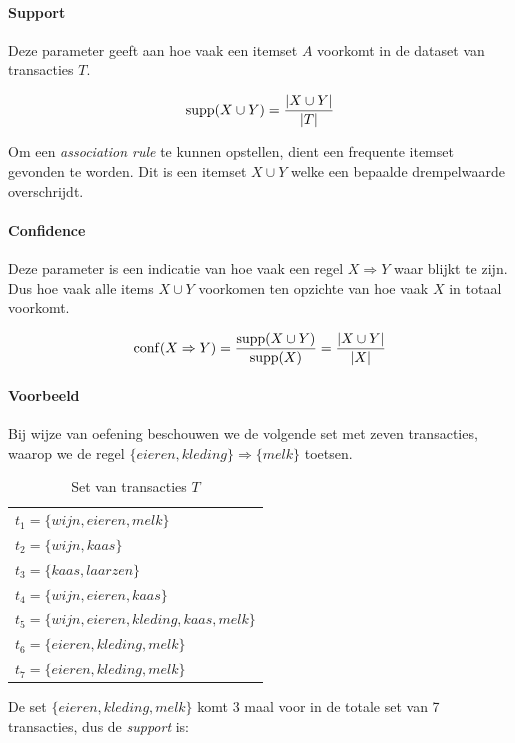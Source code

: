 \paragraph{Support}
Deze parameter geeft aan hoe vaak een itemset $A$ voorkomt in de dataset van transacties $T$. 

\begin{equation}
\operatorname{supp}(X \cup Y) = \frac{|X \cup Y|}{|T|}
\end{equation}

Om een \emph{association rule} te kunnen opstellen, dient een frequente itemset gevonden te worden. Dit is een itemset $X \cup Y$ welke een bepaalde drempelwaarde overschrijdt. 
%
\paragraph{Confidence}
Deze parameter is een indicatie van hoe vaak een regel $ X \Rightarrow Y $ waar blijkt te zijn. Dus hoe vaak alle items $X \cup Y $ voorkomen ten opzichte van hoe vaak $X$ in totaal voorkomt. 

\begin{equation}
\operatorname{conf}(X \Rightarrow Y) = \frac{\operatorname{supp}(X \cup Y)}{\operatorname{supp}(X)}= \frac{|X \cup Y|}{|X|}
\end{equation}

\paragraph{Voorbeeld} Bij wijze van oefening beschouwen we de volgende set met zeven transacties, waarop we de regel $\{eieren, kleding\} \Rightarrow \{melk\}$ toetsen.

\begin{table}[h]
\centering
\caption{Set van transacties $T$}
\label{tabel:7-transacties}
\begin{tabular}{l}
$t_1 = \{wijn, eieren, melk\}$ \\
$t_2 = \{wijn, kaas\}$ \\
$t_3 = \{kaas, laarzen\}$ \\
$t_4 = \{wijn, eieren, kaas\}$ \\
$t_5 = \{wijn, eieren, kleding, kaas, melk\}$ \\
$t_6 = \{eieren, kleding, melk\}$ \\
$t_7 = \{eieren, kleding, melk\}$
       
\end{tabular}
\end{table}

De set $\{eieren, kleding, melk\}$ komt 3 maal voor in de totale set van 7 transacties, dus de \emph{support} is:

